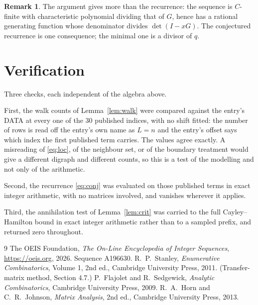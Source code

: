 \documentclass[11pt,a4paper]{article}
\theoremstyle{plain}
\theoremstyle{definition}
\newtheorem{remark}[theorem]{Remark}
\begin{document}
\begin{remark}
The argument gives more than the recurrence: the sequence is $C$-finite with characteristic
polynomial dividing that of $G$, hence has a rational generating function whose denominator
divides $\det(I-xG)$. The conjectured recurrence is one consequence; the minimal one is a
divisor of $q$.
\end{remark}

\section{Verification}

Three checks, each independent of the algebra above.

First, the walk counts of Lemma~\ref{lem:walk} were compared against the entry's DATA at
every one of the $30$ published indices, with no shift fitted: the number of rows is
read off the entry's own name as $L=n$ and the entry's offset says which index the first
published term carries. The values agree exactly. A misreading of \eqref{eq:loc}, of the
neighbour set, or of the boundary treatment would give a different digraph and different
counts, so this is a test of the modelling and not only of the arithmetic.

Second, the recurrence \eqref{eq:conj} was evaluated on those published terms in exact
integer arithmetic, with no matrices involved, and vanishes wherever it applies.

Third, the annihilation test of Lemma~\ref{lem:crit} was carried to the full
Cayley--Hamilton bound in exact integer arithmetic rather than to a sampled prefix, and
returned zero throughout.

\begin{thebibliography}{9}
 The OEIS Foundation, \emph{The On-Line Encyclopedia of Integer
Sequences}, \url{https://oeis.org}, 2026. Sequence A196630.
 R.~P.~Stanley, \emph{Enumerative Combinatorics}, Volume 1, 2nd ed.,
Cambridge University Press, 2011. (Transfer-matrix method, Section 4.7.)
 P.~Flajolet and R.~Sedgewick, \emph{Analytic Combinatorics}, Cambridge
University Press, 2009.
 R.~A.~Horn and C.~R.~Johnson, \emph{Matrix Analysis}, 2nd ed., Cambridge
University Press, 2013.
\end{thebibliography}
\end{document}
